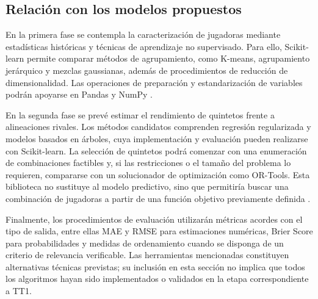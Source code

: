 \subsection{Relación con los modelos propuestos}

En la primera fase se contempla la caracterización de jugadoras mediante estadísticas históricas y técnicas de aprendizaje no supervisado. Para ello, Scikit-learn permite comparar métodos de agrupamiento, como K-means, agrupamiento jerárquico y mezclas gaussianas, además de procedimientos de reducción de dimensionalidad. Las operaciones de preparación y estandarización de variables podrán apoyarse en Pandas y NumPy \cite{sklearnGuiaOficial,pandasDocsOficial}.

En la segunda fase se prevé estimar el rendimiento de quintetos frente a alineaciones rivales. Los métodos candidatos comprenden regresión regularizada y modelos basados en árboles, cuya implementación y evaluación pueden realizarse con Scikit-learn. La selección de quintetos podrá comenzar con una enumeración de combinaciones factibles y, si las restricciones o el tamaño del problema lo requieren, compararse con un solucionador de optimización como OR-Tools. Esta biblioteca no sustituye al modelo predictivo, sino que permitiría buscar una combinación de jugadoras a partir de una función objetivo previamente definida \cite{sklearnGuiaOficial,ortoolsDocsOficial}.

Finalmente, los procedimientos de evaluación utilizarán métricas acordes con el tipo de salida, entre ellas MAE y RMSE para estimaciones numéricas, Brier Score para probabilidades y medidas de ordenamiento cuando se disponga de un criterio de relevancia verificable. Las herramientas mencionadas constituyen alternativas técnicas previstas; su inclusión en esta sección no implica que todos los algoritmos hayan sido implementados o validados en la etapa correspondiente a TT1.